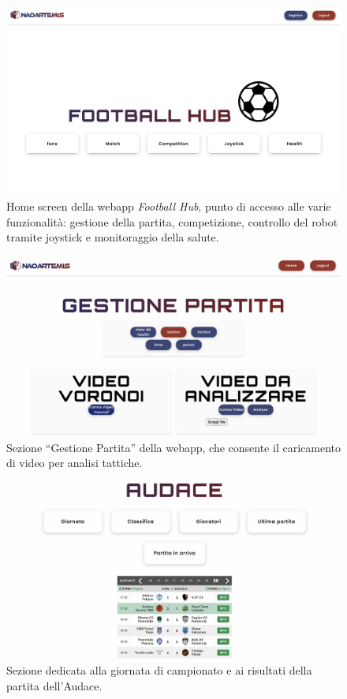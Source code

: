 \documentclass{optica-article}
\begin{document}
\begin{figure}[H]
    \centering
    \includegraphics[width=\textwidth]{figures/homescreen.png}
    \caption{Home screen della webapp \textit{Football Hub}, punto di accesso alle varie funzionalità: gestione della partita, competizione, controllo del robot tramite joystick e monitoraggio della salute.}
    \label{fig:home-screen}
\end{figure}

\begin{figure}[H]
    \centering
    \includegraphics[width=\textwidth]{figures/gestione_partita.PNG}
    \caption{Sezione “Gestione Partita” della webapp, che consente il caricamento di video per analisi tattiche.}
    \label{fig:gestione-partita}
\end{figure}

\begin{figure}[H]
  \centering
  \includegraphics[width=\textwidth]{figures/audace.jpg}
  \caption{Sezione dedicata alla giornata di campionato e ai risultati della partita dell’Audace.}
\end{figure}
\end{document}
